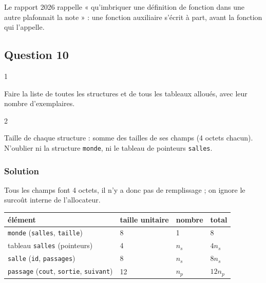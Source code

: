 \documentclass[11pt,a4paper]{article}
\begin{document}
\begin{jury}

Le rapport 2026 rappelle « qu'imbriquer une définition de fonction dans une autre plafonnait la note » : une fonction auxiliaire s'écrit à part, avant la fonction qui l'appelle.

\end{jury}

\hypertarget{question-10}{%
\subsection{Question 10}\label{question-10}}

\begin{indication}{1}

Faire la liste de toutes les structures et de tous les tableaux alloués, avec leur nombre d'exemplaires.

\end{indication}

\begin{indication}{2}

Taille de chaque structure : somme des tailles de ses champs (4 octets chacun). N'oublier ni la structure \texttt{monde}, ni le tableau de pointeurs \texttt{salles}.

\end{indication}

\hypertarget{solution-9}{%
\subsubsection{Solution}\label{solution-9}}

Tous les champs font 4 octets, il n'y a donc pas de remplissage ; on ignore le surcoût interne de l'allocateur.

\begin{longtable}[]{@{}llll@{}}
\toprule\noalign{}
élément & taille unitaire & nombre & total \\
\midrule\noalign{}
\endhead
\bottomrule\noalign{}
\endlastfoot
\texttt{monde} (\texttt{salles}, \texttt{taille}) & 8 & 1 & 8 \\
tableau \texttt{salles} (pointeurs) & 4 & \(n_s\) & \(4n_s\) \\
\texttt{salle} (\texttt{id}, \texttt{passages}) & 8 & \(n_s\) & \(8n_s\) \\
\texttt{passage} (\texttt{cout}, \texttt{sortie}, \texttt{suivant}) & 12 & \(n_p\) & \(12n_p\) \\
\end{longtable}
\end{document}

